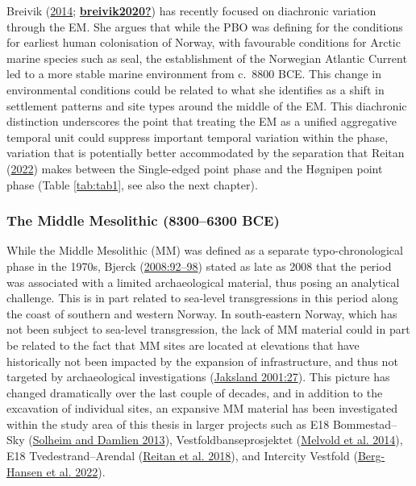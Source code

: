 \documentclass[
  a4paper,
  oneside]{uiophdthesis}
\begin{document}
Breivik (\protect\hyperlink{ref-breivik2014}{2014}; \protect\hyperlink{ref-breivik2020}{\textbf{breivik2020?}}) has recently focused on diachronic variation through the EM. She argues that while the PBO was defining for the conditions for earliest human colonisation of Norway, with favourable conditions for Arctic marine species such as seal, the establishment of the Norwegian Atlantic Current led to a more stable marine environment from c.~8800 BCE. This change in environmental conditions could be related to what she identifies as a shift in settlement patterns and site types around the middle of the EM. This diachronic distinction underscores the point that treating the EM as a unified aggregative temporal unit could suppress important temporal variation within the phase, variation that is potentially better accommodated by the separation that Reitan (\protect\hyperlink{ref-reitan2022}{2022}) makes between the Single-edged point phase and the Høgnipen point phase (Table \ref{tab:tab1}, see also the next chapter).

\hypertarget{the-middle-mesolithic-83006300-bce}{%
\subsubsection{The Middle Mesolithic (8300--6300 BCE)}\label{the-middle-mesolithic-83006300-bce}}

While the Middle Mesolithic (MM) was defined as a separate typo-chronological phase in the 1970s, Bjerck (\protect\hyperlink{ref-bjerck2008}{2008:92--98}) stated as late as 2008 that the period was associated with a limited archaeological material, thus posing an analytical challenge. This is in part related to sea-level transgressions in this period along the coast of southern and western Norway. In south-eastern Norway, which has not been subject to sea-level transgression, the lack of MM material could in part be related to the fact that MM sites are located at elevations that have historically not been impacted by the expansion of infrastructure, and thus not targeted by archaeological investigations (\protect\hyperlink{ref-jaksland2001}{Jaksland 2001:27}). This picture has changed dramatically over the last couple of decades, and in addition to the excavation of individual sites, an expansive MM material has been investigated within the study area of this thesis in larger projects such as E18 Bommestad--Sky (\protect\hyperlink{ref-solheim2013c}{Solheim and Damlien 2013}), Vestfoldbanseprosjektet (\protect\hyperlink{ref-melvold2014b}{Melvold et al. 2014}), E18 Tvedestrand--Arendal (\protect\hyperlink{ref-reitan2018c}{Reitan et al. 2018}), and Intercity Vestfold (\protect\hyperlink{ref-berg-hansen2022}{Berg-Hansen et al. 2022}).
\end{document}
